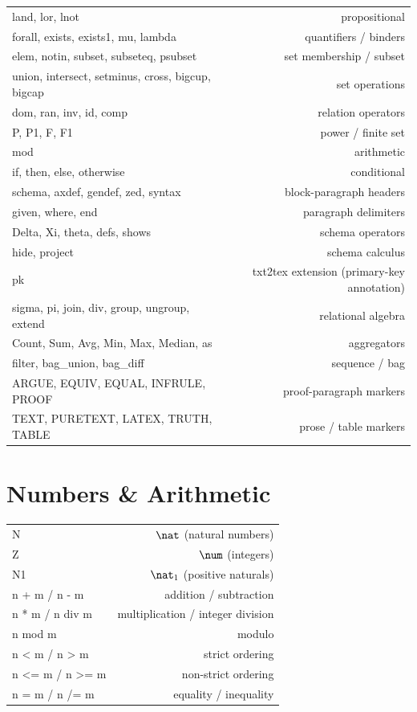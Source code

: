 \documentclass[10pt,landscape,a4paper]{article}
\begin{document}
\begin{multicols}{2}
\begin{tabularx}{\columnwidth}{LR}
land, lor, lnot                            & propositional \\
forall, exists, exists1, mu, lambda        & quantifiers / binders \\
elem, notin, subset, subseteq, psubset     & set membership / subset \\
union, intersect, setminus, cross, bigcup, bigcap & set operations \\
dom, ran, inv, id, comp                    & relation operators \\
P, P1, F, F1                               & power / finite set \\
mod                                        & arithmetic \\
if, then, else, otherwise                  & conditional \\
schema, axdef, gendef, zed, syntax         & block-paragraph headers \\
given, where, end                          & paragraph delimiters \\
Delta, Xi, theta, defs, shows              & schema operators \\
hide, project                              & schema calculus \\
pk                                         & txt2tex extension (primary-key annotation) \\
sigma, pi, join, div, group, ungroup, extend & relational algebra \\
Count, Sum, Avg, Min, Max, Median, as      & aggregators \\
filter, bag\_union, bag\_diff              & sequence / bag \\
ARGUE, EQUIV, EQUAL, INFRULE, PROOF        & proof-paragraph markers \\
TEXT, PURETEXT, LATEX, TRUTH, TABLE        & prose / table markers \\
\end{tabularx}

\section{Numbers \& Arithmetic}

\begin{tabularx}{\columnwidth}{LR}
N                    & $\nat$ (natural numbers) \\
Z                    & $\num$ (integers) \\
N1                   & $\nat_1$ (positive naturals) \\
n + m / n - m        & addition / subtraction \\
n * m / n div m      & multiplication / integer division \\
n mod m              & modulo \\
n < m / n > m        & strict ordering \\
n <= m / n >= m      & non-strict ordering \\
n = m / n /= m       & equality / inequality \\
\end{tabularx}


\end{multicols}
\end{document}
